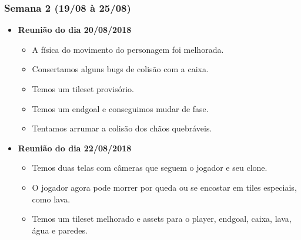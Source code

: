 \documentclass[a4paper, 11pt]{article}
\begin{document}
\subsubsection{Semana 2 (19/08 à 25/08)}
	\begin{itemize} 
		\item \textbf{Reunião do dia 20/08/2018}

		\begin{itemize}
	    	\item A física do movimento do personagem foi melhorada.
	    	\item Consertamos alguns bugs de colisão com a caixa.
	    	\item Temos um tileset provisório.
	    	\item Temos um endgoal e conseguimos mudar de fase.
	    	\item Tentamos arrumar a colisão dos chãos quebráveis.
	    \end{itemize}

		\item \textbf{Reunião do dia 22/08/2018}

		\begin{itemize}
	    	\item Temos duas telas com câmeras que seguem o jogador e seu clone.
	    	\item O jogador agora pode morrer por queda ou se encostar em tiles especiais, como lava.
	    	\item Temos um tileset melhorado e assets para o player, endgoal, caixa, lava, água e paredes.
	 	\end{itemize}

	\end{itemize}
\end{document}
